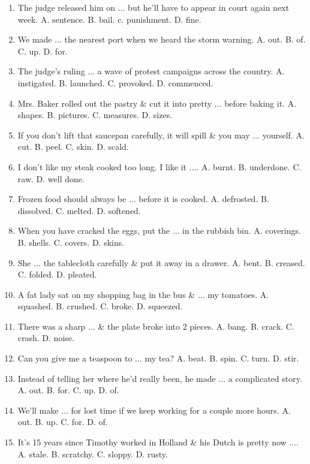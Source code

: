 \documentclass{article}
\numberwithin{equation}{section}
\begin{document}
\begin{enumerate}[leftmargin=8mm]
	\item The judge released him on $\ldots$ but he'll have to appear in court again next week. {\sf A.} sentence. {\sf B.} bail. c. punishment. {\sf D.} fine.
	\item We made $\ldots$ the nearest port when we heard the storm warning. {\sf A.} out. {\sf B.} of. {\sf C.} up. {\sf D.} for.
	\item The judge's ruling $\ldots$ a wave of protest campaigns across the country. {\sf A.} instigated. {\sf B.} launched. {\sf C.} provoked. {\sf D.} commenced.
	\item Mrs. Baker rolled out the pastry \& cut it into pretty $\ldots$ before baking it. {\sf A.} shapes. {\sf B.} pictures. {\sf C.} measures. {\sf D.} sizes.
	\item If you don't lift that saucepan carefully, it will spill \& you may $\ldots$ yourself. {\sf A.} cut. {\sf B.} peel. {\sf C.} skin. {\sf D.} scald.
	\item I don't like my steak cooked too long. I like it $\ldots$. {\sf A.} burnt. {\sf B.} underdone. {\sf C.} raw. {\sf D.} well done.
	\item Frozen food should always be $\ldots$ before it is cooked. {\sf A.} defrosted. {\sf B.} dissolved. {\sf C.} melted. {\sf D.} softened.
	\item When you have cracked the eggs, put the $\ldots$ in the rubbish bin. {\sf A.} coverings. {\sf B.} shells. {\sf C.} covers. {\sf D.} skins.
	\item She $\ldots$ the tablecloth carefully \& put it away in a drawer. {\sf A.} bent. {\sf B.} creased. {\sf C.} folded. {\sf D.} pleated.
	\item A fat lady sat on my shopping bag in the bus \& $\ldots$ my tomatoes. {\sf A.} squashed. {\sf B.} crushed. {\sf C.} broke. {\sf D.} squeezed.
	\item There was a sharp $\ldots$ \& the plate broke into 2 pieces. {\sf A.} bang. {\sf B.} crack. {\sf C.} crash. {\sf D.} noise.
	\item Can you give me a teaspoon to $\ldots$ my tea? {\sf A.} beat. {\sf B.} spin. {\sf C.} turn. {\sf D.} stir.
	\item Instead of telling her where he'd really been, he made $\ldots$ a complicated story. {\sf A.} out. {\sf B.} for. {\sf C.} up. {\sf D.} of.
	\item We'll make $\ldots$ for lost time if we keep working for a couple more hours. {\sf A.} out. {\sf B.} up. {\sf C.} for. {\sf D.} of.
	\item It's 15 years since Timothy worked in Holland \& his Dutch is pretty now $\ldots$. {\sf A.} stale. {\sf B.} scratchy. {\sf C.} sloppy. {\sf D.} rusty.

\end{enumerate}
\end{document}
